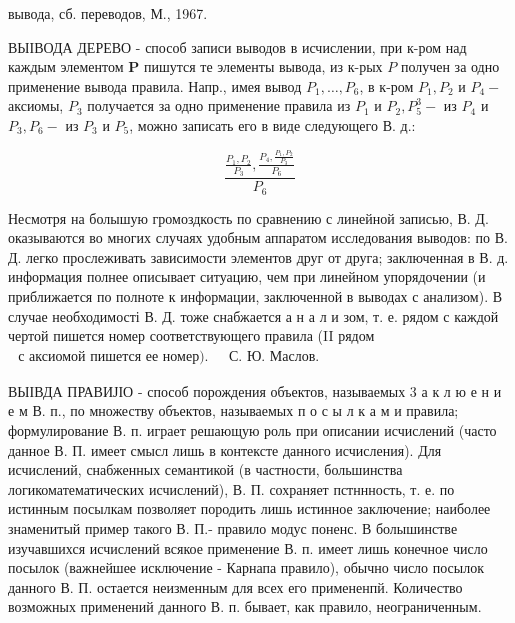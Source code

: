 \documentclass[10pt]{article}
\begin{document}
вывода, сб. переводов, М., 1967.

ВЫІВОДА ДЕРЕВО - способ записи выводов в исчислении, при к-ром над каждым элементом $\boldsymbol{P}$ пишутся те элементы вывода, из к-рых $P$ получен за одно применение вывода правила. Напр., имея вывод $P_{1}, \ldots, P_{6}$, в к-ром $P_{1}, P_{2}$ и $P_{4}-$ аксиомы, $P_{3}$ получается за одно применение правила из $P_{1}$ и $P_{2}, P_{5}^{3}-$ из $P_{4}$ и $P_{3}, P_{6}-$ из $P_{3}$ и $P_{5}$, можно записать его в виде следующего В. д.:



\[

\frac{\frac{P_{1}, P_{2}}{P_{3}}, \frac{P_{4}, \frac{P_{1}, P_{2}}{P_{3}}}{P_{6}}}{P_{6}}

\]



Несмотря на болышую громоздкость по сравнению с линейной записью, В. Д. оказываются во многих случаях удобным аппаратом исследования выводов: по В. Д. легко прослеживать зависимости элементов друг от друга; заключенная в В. д. информация полнее описывает ситуацию, чем при линейном упорядочении (и приближается по полноте к информации, заключенной в выводах с анализом). В случае необходимості В. Д. тоже снабжается а н а л и зом, т. е. рядом с каждой чертой пишется номер соответствующего правила (II рядом $\begin{array}{ll}\text { с аксиомой пишется ее номер). } & \text { С. Ю. Маслов. }\end{array}$



ВЫІВДА ПРАВИЈІО - способ порождения объектов, называемых 3 а к л ю е н и е м В. п., по множеству объектов, называемых п о с ы л к а м и правила; формулирование В. п. играет решающую роль при описании исчислений (часто данное В. П. имеет смысл лишь в контексте данного исчисления). Для исчислений, снабженных семантикой (в частности, большинства логикоматематических исчислений), В. П. сохраняет пстннность, т. е. по истинным посылкам позволяет породить лишь истинное заключение; наиболее знаменитый пример такого В. П.- правило модус поненс. В болышинстве изучавшихся исчислений всякое применение В. п. имеет лишь конечное число посылок (важнейшее исключение - Карнапа правило), обычно число посылок данного В. П. остается неизменным для всех его примененпй. Количество возможных применений данного В. п. бывает, как правило, неограниченным.
\end{document}
